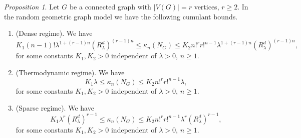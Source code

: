 \documentclass[bj,authoryear,noshowframe]{imsart}
\theoremstyle{plain}
\theoremstyle{remark}
\newtheorem{prop}{Proposition}[section]
\begin{document}
 \begin{prop}
     \label{thm8}
  Let $G$ be a connected graph with $|V(G)|=r$ vertices, $r\geq 2$.
  In the random geometric graph model we have the following cumulant bounds. 
  \begin{enumerate} %
  \item (Dense regime). 
    We have
    \begin{equation}
      \label{b1}
      K_1 (n-1)! \lambda^{1+(r-1)n} ( R_\lambda^d)^{(r-1)n}
      \leq \kappa_n(N_G) \leq K_2 n!^r r!^{n-1}
  \lambda^{1+(r-1)n} ( R_\lambda^d)^{(r-1)n}, 
 \end{equation}
 for some constants $K_1, K_2 > 0$ independent
 of $\lambda >0$, $n\geq 1$. 
   \item (Thermodynamic regime). 
    We have
    \begin{equation}
 \label{b2}
      K_1 \lambda \leq \kappa_n(N_G)\leq K_2 n!^r r!^{n-1}\lambda,
 \end{equation}
 for some constants $K_1, K_2 > 0$ independent
 of $\lambda >0$, $n\geq 1$. 
   \item (Sparse regime). 
    We have
    \begin{equation}
  \label{b3}
          K_1 \lambda^r ( R_\lambda^d)^{r-1} 
      \leq \kappa_n(N_G)\leq K_2 n!^r r!^{n-1} \lambda^r (R_\lambda^d)^{r-1},
 \end{equation}
 for some constants $K_1, K_2 > 0$ independent
 of $\lambda >0$, $n\geq 1$. 
  \end{enumerate}
 \end{prop}
\end{document}

